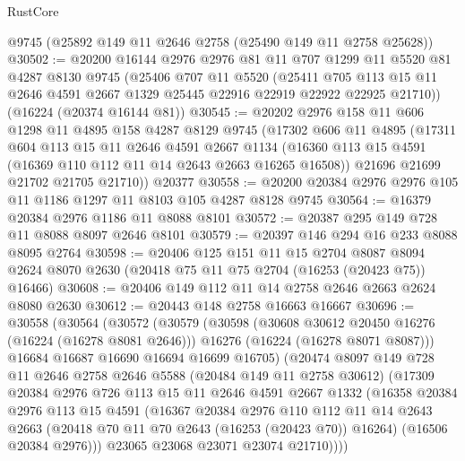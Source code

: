 \begin{lexlean}{RustCore}
\begin{coremodule}
    @9745
    (@25892 @149 @11 @2646 @2758 (@25490 @149 @11 @2758 @25628))
@30502 := @20200
    @16144
    @2976
    @2976
    @81
    @11
    @707
    @1299
    @11
    @5520
    @81
    @4287
    @8130
    @9745
    (@25406
      @707
      @11
      @5520
      (@25411 @705 @113 @15 @11 @2646 @4591 @2667 @1329 @25445 @22916 @22919 @22922 @22925 @21710))
    (@16224 (@20374 @16144 @81))
@30545 := @20202
    @2976
    @158
    @11
    @606
    @1298
    @11
    @4895
    @158
    @4287
    @8129
    @9745
    (@17302
      @606
      @11
      @4895
      (@17311
        @604
        @113
        @15
        @11
        @2646
        @4591
        @2667
        @1134
        (@16360 @113 @15 @4591 (@16369 @110 @112 @11 @14 @2643 @2663 @16265 @16508))
        @21696
        @21699
        @21702
        @21705
        @21710))
    @20377
@30558 := @20200 @20384 @2976 @2976 @105 @11 @1186 @1297 @11 @8103 @105 @4287 @8128 @9745
@30564 := @16379 @20384 @2976 @1186 @11 @8088 @8101
@30572 := @20387 @295 @149 @728 @11 @8088 @8097 @2646 @8101
@30579 := @20397 @146 @294 @16 @233 @8088 @8095 @2764
@30598 := @20406
    @125
    @151
    @11
    @15
    @2704
    @8087
    @8094
    @2624
    @8070
    @2630
    (@20418 @75 @11 @75 @2704 (@16253 (@20423 @75)) @16466)
@30608 := @20406 @149 @112 @11 @14 @2758 @2646 @2663 @2624 @8080 @2630
@30612 := @20443 @148 @2758 @16663 @16667
@30696 := @30558
    (@30564
      (@30572
        (@30579
          (@30598
            (@30608 @30612 @20450 @16276 (@16224 (@16278 @8081 @2646)))
            @16276
            (@16224 (@16278 @8071 @8087)))
          @16684
          @16687
          @16690
          @16694
          @16699
          @16705)
        (@20474
          @8097
          @149
          @728
          @11
          @2646
          @2758
          @2646
          @5588
          (@20484 @149 @11 @2758 @30612)
          (@17309
            @20384
            @2976
            @726
            @113
            @15
            @11
            @2646
            @4591
            @2667
            @1332
            (@16358
              @20384
              @2976
              @113
              @15
              @4591
              (@16367
                @20384
                @2976
                @110
                @112
                @11
                @14
                @2643
                @2663
                (@20418 @70 @11 @70 @2643 (@16253 (@20423 @70)) @16264)
                (@16506 @20384 @2976)))
            @23065
            @23068
            @23071
            @23074
            @21710))))

\end{coremodule}
\end{lexlean}
